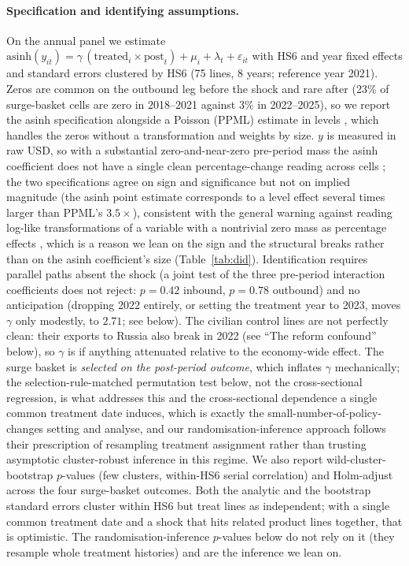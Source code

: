 \documentclass[12pt]{article}
\begin{document}
\paragraph{Specification and identifying assumptions.} On the annual panel we estimate
$\text{asinh}(y_{it}) = \gamma\,(\text{treated}_i \times \text{post}_t) + \mu_i + \lambda_t +
\varepsilon_{it}$ with HS6 and year fixed effects and standard errors clustered by HS6 (75
lines, 8 years; reference year 2021). Zeros are common on the outbound leg before the shock
and rare after (23\% of surge-basket cells are zero in 2018--2021 against 3\% in 2022--2025), so
we report the asinh specification alongside a Poisson (PPML) estimate in levels
\citep{silvatenreyro2006}, which handles
the zeros without a transformation and weights by size. $y$ is measured in raw USD, so with a
substantial zero-and-near-zero pre-period mass the asinh coefficient does not have a single
clean percentage-change reading across cells \citep{bellemarewichman2020}; the two specifications agree on sign and
significance but not on implied magnitude (the asinh point estimate corresponds to a level
effect several times larger than PPML's $3.5\times$), consistent with the general warning
against reading log-like transformations of a variable with a nontrivial zero mass as
percentage effects \citep{chenroth2024}, which is a reason we lean on the sign and
the structural breaks rather than on the asinh coefficient's size (Table~\ref{tab:did}).
Identification requires parallel paths absent the shock
(a joint test of the three pre-period interaction coefficients does not reject: $p = 0.42$
inbound, $p = 0.78$ outbound) and no anticipation (dropping 2022 entirely, or setting the
treatment year to 2023, moves $\gamma$ only modestly, to $2.71$; see below). The civilian
control lines are not perfectly clean: their exports to Russia also break in 2022
(see ``The reform confound'' below), so $\gamma$ is if anything attenuated relative to the
economy-wide effect. The surge basket is \emph{selected on the post-period outcome}, which inflates $\gamma$
mechanically; the selection-rule-matched permutation test below, not the cross-sectional
regression, is what addresses this and the cross-sectional dependence a single common
treatment date induces, which is exactly the small-number-of-policy-changes setting
\citet{conleytaber2011} and \citet{fermanpinto2019} analyse, and our randomisation-inference
approach follows their prescription of resampling treatment assignment rather than trusting
asymptotic cluster-robust inference in this regime. We also report wild-cluster-bootstrap
$p$-values \citep{cameronbellermillergelbach2008} (few clusters,
within-HS6 serial correlation) and Holm-adjust across the four surge-basket outcomes. Both the
analytic and the bootstrap standard errors cluster within HS6 but treat lines as independent;
with a single common treatment date and a shock that hits related product lines together, that
is optimistic. The randomisation-inference $p$-values below do not rely on it (they resample
whole treatment histories) and are the inference we lean on.
\end{document}
